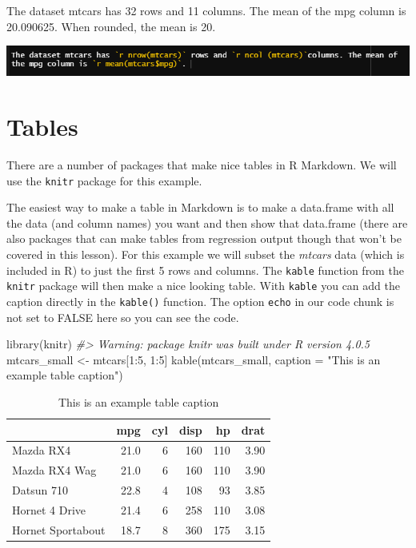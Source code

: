 \documentclass[
  12pt,
  openany]{book}
\newenvironment{Shaded}{\begin{snugshade}}{\end{snugshade}}
\newcommand{\AttributeTok}[1]{\textcolor[rgb]{0.61,0.61,0.61}{#1}}
\newcommand{\CommentTok}[1]{\textcolor[rgb]{0.37,0.37,0.37}{\textit{#1}}}
\newcommand{\DecValTok}[1]{\textcolor[rgb]{0.06,0.06,0.06}{#1}}
\newcommand{\FunctionTok}[1]{\textcolor[rgb]{0,0,0}{#1}}
\newcommand{\NormalTok}[1]{#1}
\newcommand{\OtherTok}[1]{\textcolor[rgb]{0.37,0.37,0.37}{#1}}
\newcommand{\SpecialCharTok}[1]{\textcolor[rgb]{0,0,0}{#1}}
\newcommand{\StringTok}[1]{\textcolor[rgb]{0.5,0.5,0.5}{#1}}
\begin{document}
The dataset mtcars has 32 rows and 11 columns. The mean of the mpg column is 20.090625. When rounded, the mean is 20.

\includegraphics{images/inline_code.PNG}

\hypertarget{tables}{%
\section{Tables}\label{tables}}

There are a number of packages that make nice tables in R Markdown. We will use the \texttt{knitr} package for this example.

The easiest way to make a table in Markdown is to make a data.frame with all the data (and column names) you want and then show that data.frame (there are also packages that can make tables from regression output though that won't be covered in this lesson). For this example we will subset the \emph{mtcars} data (which is included in R) to just the first 5 rows and columns. The \texttt{kable} function from the \texttt{knitr} package will then make a nice looking table. With \texttt{kable} you can add the caption directly in the \texttt{kable()} function. The option \texttt{echo} in our code chunk is not set to FALSE here so you can see the code.

\begin{Shaded}
\begin{Highlighting}[]
\FunctionTok{library}\NormalTok{(knitr)}
\CommentTok{\#\textgreater{} Warning: package \textquotesingle{}knitr\textquotesingle{} was built under R version 4.0.5}
\NormalTok{mtcars\_small }\OtherTok{\textless{}{-}}\NormalTok{ mtcars[}\DecValTok{1}\SpecialCharTok{:}\DecValTok{5}\NormalTok{, }\DecValTok{1}\SpecialCharTok{:}\DecValTok{5}\NormalTok{]}
\FunctionTok{kable}\NormalTok{(mtcars\_small, }\AttributeTok{caption =} \StringTok{"This is an example table caption"}\NormalTok{)}
\end{Highlighting}
\end{Shaded}

\begin{table}

\caption{\label{tab:unnamed-chunk-2}This is an example table caption}
\centering
\begin{tabular}[t]{l|r|r|r|r|r}
\hline
  & mpg & cyl & disp & hp & drat\\
\hline
Mazda RX4 & 21.0 & 6 & 160 & 110 & 3.90\\
\hline
Mazda RX4 Wag & 21.0 & 6 & 160 & 110 & 3.90\\
\hline
Datsun 710 & 22.8 & 4 & 108 & 93 & 3.85\\
\hline
Hornet 4 Drive & 21.4 & 6 & 258 & 110 & 3.08\\
\hline
Hornet Sportabout & 18.7 & 8 & 360 & 175 & 3.15\\
\hline
\end{tabular}
\end{table}
\end{document}
